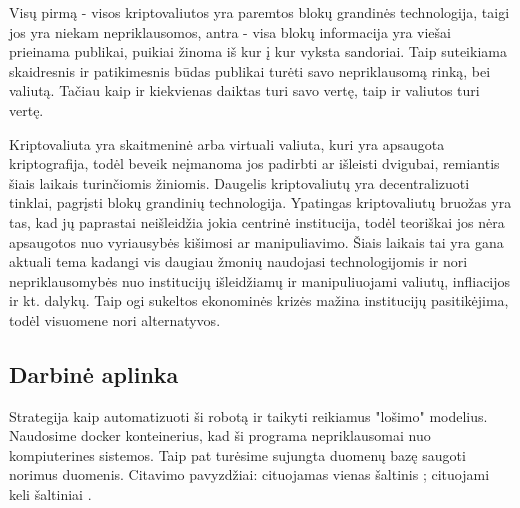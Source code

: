 \documentclass{VUMIFInfKursinis}
\begin{document}
Visų pirmą - visos kriptovaliutos yra paremtos blokų grandinės technologija, taigi jos yra
niekam nepriklausomos, antra - visa blokų informacija yra viešai prieinama publikai, puikiai žinoma iš kur į kur vyksta sandoriai. 
Taip suteikiama skaidresnis ir patikimesnis būdas publikai turėti savo nepriklausomą rinką, bei valiutą. 
Tačiau kaip ir kiekvienas daiktas turi savo vertę, taip ir valiutos turi vertę.

Kriptovaliuta yra skaitmeninė arba virtuali valiuta, kuri yra apsaugota kriptografija, todėl beveik neįmanoma jos padirbti ar išleisti dvigubai, remiantis šiais laikais turinčiomis
žiniomis. Daugelis kriptovaliutų yra decentralizuoti tinklai, pagrįsti blokų grandinių technologija. Ypatingas kriptovaliutų bruožas yra tas, kad jų paprastai neišleidžia
jokia centrinė institucija, todėl teoriškai jos nėra apsaugotos nuo vyriausybės kišimosi ar manipuliavimo. Šiais laikais tai yra gana aktuali tema kadangi vis daugiau žmonių 
naudojasi technologijomis ir nori nepriklausomybės nuo institucijų išleidžiamų ir manipuliuojami valiutų, infliacijos ir kt. dalykų. Taip ogi sukeltos ekonominės krizės mažina
institucijų pasitikėjima, todėl visuomene nori alternatyvos.



\subsection{Darbinė aplinka}
Strategija kaip automatizuoti ši robotą ir taikyti reikiamus "lošimo" modelius. Naudosime docker konteinerius, kad ši programa nepriklausomai 
nuo kompiuterines sistemos. Taip pat turėsime sujungta duomenų bazę saugoti norimus duomenis. 
Citavimo pavyzdžiai: cituojamas vienas šaltinis \cite{PvzStraipsnLt}; cituojami
keli šaltiniai \cite{PvzStraipsnEn, PvzKonfLt, PvzKonfEn, PvzKnygLt, PvzKnygEn,
  PvzElPubLt, PvzElPubEn, PvzMagistrLt, PvzPhdEn}.
\end{document}
